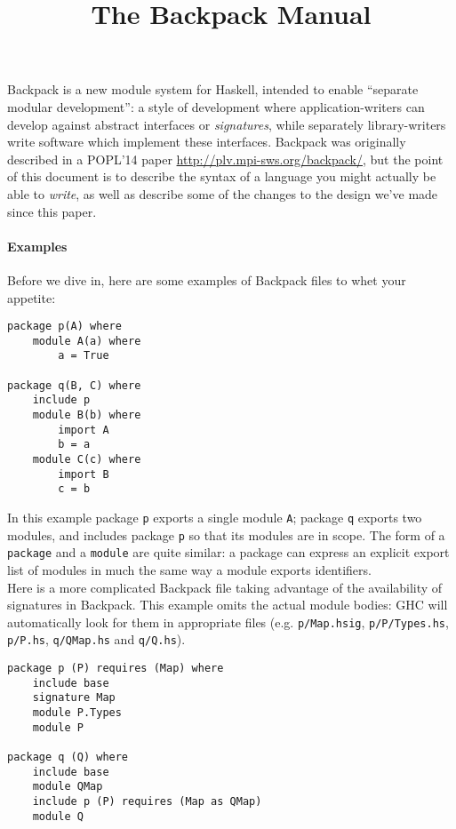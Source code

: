 \documentclass{article}
\title{The Backpack Manual}
\begin{document}
\maketitle

Backpack is a new module system for Haskell, intended to enable
``separate modular development'': a style of development where
application-writers can develop against abstract interfaces or
\emph{signatures}, while separately library-writers write software which
implement these interfaces.  Backpack was originally described in a
POPL'14 paper \url{http://plv.mpi-sws.org/backpack/}, but the point of
this document is to describe the syntax of a language you might actually
be able to \emph{write}, as well as describe some of the changes to the
design we've made since this paper.

\paragraph{Examples}

Before we dive in, here are some examples of Backpack files to whet
your appetite:

\begin{verbatim}
package p(A) where
    module A(a) where
        a = True

package q(B, C) where
    include p
    module B(b) where
        import A
        b = a
    module C(c) where
        import B
        c = b
\end{verbatim}

In this example package \verb|p| exports a single module \verb|A|; package \verb|q| exports
two modules, and includes package \verb|p| so that its modules are in
scope.  The form of a \verb|package| and a \verb|module| are quite similar:
a package can express an explicit export list of modules in much the same
way a module exports identifiers. \\

Here is a more complicated Backpack file taking advantage of the availability
of signatures in Backpack.  This example omits the actual module bodies: GHC
will automatically look for them in appropriate files (e.g. \verb|p/Map.hsig|,
\verb|p/P/Types.hs|, \verb|p/P.hs|, \verb|q/QMap.hs| and \verb|q/Q.hs|).

\begin{verbatim}
package p (P) requires (Map) where
    include base
    signature Map
    module P.Types
    module P

package q (Q) where
    include base
    module QMap
    include p (P) requires (Map as QMap)
    module Q
\end{verbatim}
\end{document}
